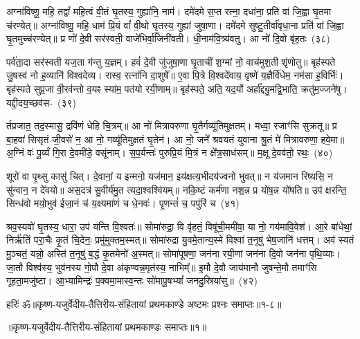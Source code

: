 अग्ना॑विष्णू॒ महि॒ तद्वां᳚ महि॒त्वं वी॒तं घृ॒तस्य॒ गुह्या॑नि॒ नाम॑। दमे॑दमे स॒प्त रत्ना॒ दधा॑ना॒ प्रति॑ वां जि॒ह्वा घृ॒तमा च॑रण्येत्॥ अग्ना॑विष्णू॒ महि॒ धाम॑ प्रि॒यं वां᳚ वी॒थो घृ॒तस्य॒ गुह्या॑ जुषा॒णा। दमे॑दमे सुष्टु॒तीर्वा॑वृधा॒ना प्रति॑ वां जि॒ह्वा घृ॒तमुच्च॑रण्येत्॥ प्र णो॑ दे॒वी सर॑स्वती॒ वाजे॑भिर्वा॒जिनी॑वती। धी॒नाम॑वि॒त्र्य॑वतु। आ नो॑ दि॒वो बृ॑ह॒तः~(३८)\ip

पर्व॑ता॒दा सर॑स्वती यज॒ता ग॑न्तु य॒ज्ञम्। हवं॑ दे॒वी जु॑जुषा॒णा घृ॒ताची॑ श॒ग्मां नो॒ वाच॑मुश॒ती शृ॑णोतु॥ बृह॑स्पते जु॒षस्व॑ नो ह॒व्यानि॑ विश्वदेव्य। रास्व॒ रत्ना॑नि दा॒शुषे᳚॥ ए॒वा पि॒त्रे वि॒श्वदे॑वाय॒ वृष्णे॑ य॒ज्ञैर्वि॑धेम॒ नम॑सा ह॒विर्भिः॑। बृह॑स्पते सुप्र॒जा वी॒रव॑न्तो व॒यꣴ स्या॑म॒ पत॑यो रयी॒णाम्॥ बृह॑स्पते॒ अति॒ यद॒र्यो अर्\mbox{}हा᳚द्द्यु॒मद्वि॒भाति॒ क्रतु॑म॒ज्जने॑षु। यद्दी॒दय॒च्छव॑स-~(३९)\ip

र्तप्रजात॒ तद॒स्मासु॒ द्रवि॑णं धेहि चि॒त्रम्॥ आ नो॑ मित्रावरुणा घृ॒तैर्गव्यू॑तिमुक्षतम्। मध्वा॒ रजाꣳ॑सि सुक्रतू॥ प्र बा॒हवा॑ सिसृतं जी॒वसे॑ न॒ आ नो॒ गव्यू॑तिमुक्षतं घृ॒तेन॑। आ नो॒ जने᳚ श्रवयतं युवाना श्रु॒तं मे॑ मित्रावरुणा॒ हवे॒मा॥ अ॒ग्निं वः॑ पू॒र्व्यं गि॒रा दे॒वमी॑डे॒ वसू॑नाम्। स॒प॒र्यन्तः॑ पुरुप्रि॒यं मि॒त्रं न क्षे᳚त्र॒साध॑सम्॥ म॒क्षू दे॒वव॑तो॒ रथः॒~(४०)\ip

शूरो॑ वा पृ॒थ्सु कासु॑ चित्। दे॒वानां॒ य इन्मनो॒ यज॑मान॒ इय॑क्षत्य॒भीदय॑ज्वनो भुवत्॥ न य॑जमान रिष्यसि॒ न सु॑न्वान॒ न दे॑वयो॥ अस॒दत्र॑ सु॒वीर्य॑मु॒त त्यदा॒श्वश्वि॑यम्॥ नकि॒ष्टं कर्म॑णा नश॒न्न प्र यो॑ष॒न्न यो॑षति॥ उप॑ क्षरन्ति॒ सिन्ध॑वो मयो॒भुव॑ ईजा॒नं च॑ य॒क्ष्यमा॑णं च धे॒नवः॑। पृ॒णन्तं॑ च॒ पपु॑रिं च~(४१)\ip

श्रव॒स्यवो॑ घृ॒तस्य॒ धारा॒ उप॑ यन्ति वि॒श्वतः॑॥ सोमा॑रुद्रा॒ वि वृ॑हतं॒ विषू॑ची॒ममी॑वा॒ या नो॒ गय॑मावि॒वेश॑। आ॒रे बा॑धेथां॒ निर्\mbox{}ऋ॑तिं परा॒चैः कृ॒तं चि॒देनः॒ प्रमु॑मुक्तम॒स्मत्॥ सोमा॑रुद्रा यु॒वमे॒तान्य॒स्मे विश्वा॑ त॒नूषु॑ भेष॒जानि॑ धत्तम्। अव॑ स्यतं मु॒ञ्चतं॒ यन्नो॒ अस्ति॑ त॒नूषु॑ ब॒द्धं कृ॒तमेनो॑ अ॒स्मत्॥ सोमा॑पूषणा॒ जन॑ना रयी॒णां जन॑ना दि॒वो जन॑ना पृथि॒व्याः। जा॒तौ विश्व॑स्य॒ भुव॑नस्य गो॒पौ दे॒वा अ॑कृण्वन्न॒मृत॑स्य॒ नाभिम्᳚॥ इ॒मौ दे॒वौ जाय॑मानौ जुषन्ते॒मौ तमाꣳ॑सि गूहता॒मजु॑ष्टा। आ॒भ्यामिन्द्रः॑ प॒क्वमा॒मास्व॒न्तः सो॑मापू॒ष\-भ्यां᳚ जनदु॒स्रिया॑सु॥~(४२)\ip

{\anuvakamend[{बृ॒ह॒तः शव॑सा॒ रथः॒ पपु॑रिं च दि॒वो जन॑ना॒ पञ्च॑विꣳशतिश्च}]}%

{हरिः॑ ॐ}{॥कृष्ण-यजुर्वेदीय-तैत्तिरीय-संहितायां प्रथमकाण्डे अष्टमः प्रश्नः समाप्तः॥१-८॥}

\centerline{॥कृष्ण-यजुर्वेदीय-तैत्तिरीय-संहितायां प्रथमकाण्डः समाप्तः॥१॥}

\medskip

\centerline{\hyperref[sec:startkanda1]{\closesection}}



\kandaend


